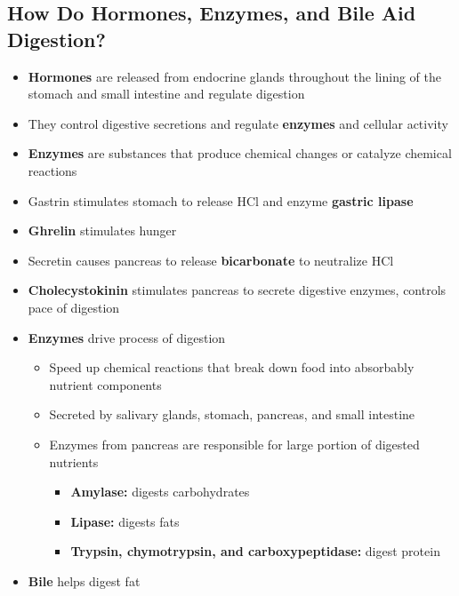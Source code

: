\documentclass[12pt]{article}
\begin{document}
        \subsection{How Do Hormones, Enzymes, and Bile Aid Digestion?}
            \begin{itemize}
                \item \textbf{Hormones} are released from endocrine glands throughout the lining of the stomach and small intestine and regulate digestion
                \item They control digestive secretions and regulate \textbf{enzymes} and cellular activity
                \item \textbf{Enzymes} are substances that produce chemical changes or catalyze chemical reactions
                \item Gastrin stimulates stomach to release HCl and enzyme \textbf{gastric lipase}
                \item \textbf{Ghrelin} stimulates hunger
                \item Secretin causes pancreas to release \textbf{bicarbonate} to neutralize HCl
                \item \textbf{Cholecystokinin} stimulates pancreas to secrete digestive enzymes, controls pace of digestion
                \item \textbf{Enzymes} drive process of digestion
                    \begin{itemize}
                        \item Speed up chemical reactions that break down food into absorbably nutrient components
                        \item Secreted by salivary glands, stomach, pancreas, and small intestine
                        \item Enzymes from pancreas are responsible for large portion of digested nutrients
                            \begin{itemize}
                                \item \textbf{Amylase:} digests carbohydrates
                                \item \textbf{Lipase:} digests fats
                                \item \textbf{Trypsin, chymotrypsin, and carboxypeptidase:} digest protein
                            \end{itemize}
                    \end{itemize}
                \item \textbf{Bile} helps digest fat

\end{itemize}
\end{document}
